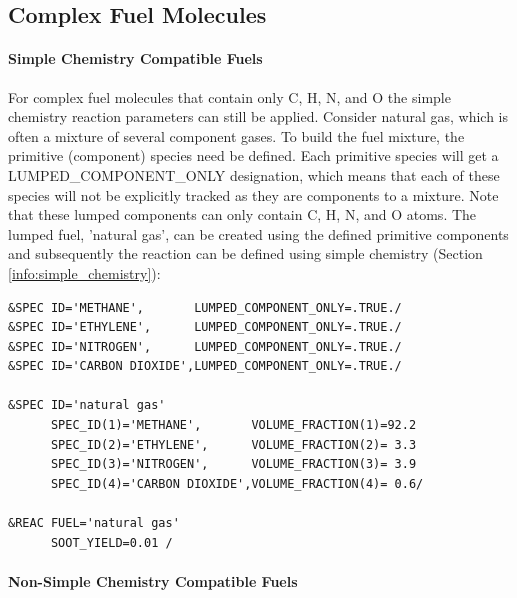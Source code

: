 \documentclass[11pt]{book}
\begin{document}
\subsection{Complex Fuel Molecules}
\label{info:Complex_Fuel}

\paragraph{Simple Chemistry Compatible Fuels}

For complex fuel molecules that contain only C, H, N, and O the simple chemistry reaction parameters can still be applied. Consider natural gas, which is often a mixture of several component gases. To build the fuel mixture, the primitive (component) species need be defined. Each primitive species will get a {\ct LUMPED\_COMPONENT\_ONLY} designation, which means that each of these species will not be explicitly tracked as they are components to a mixture.  Note that these lumped components can only contain C, H, N, and O atoms. The lumped fuel, {\ct 'natural gas'}, can be created using the defined primitive components and subsequently the reaction can be defined using simple chemistry (Section \ref{info:simple_chemistry}):
\begin{lstlisting}
&SPEC ID='METHANE',       LUMPED_COMPONENT_ONLY=.TRUE./
&SPEC ID='ETHYLENE',      LUMPED_COMPONENT_ONLY=.TRUE./
&SPEC ID='NITROGEN',      LUMPED_COMPONENT_ONLY=.TRUE./
&SPEC ID='CARBON DIOXIDE',LUMPED_COMPONENT_ONLY=.TRUE./

&SPEC ID='natural gas'
      SPEC_ID(1)='METHANE',       VOLUME_FRACTION(1)=92.2
      SPEC_ID(2)='ETHYLENE',      VOLUME_FRACTION(2)= 3.3
      SPEC_ID(3)='NITROGEN',      VOLUME_FRACTION(3)= 3.9
      SPEC_ID(4)='CARBON DIOXIDE',VOLUME_FRACTION(4)= 0.6/

&REAC FUEL='natural gas'
      SOOT_YIELD=0.01 /
\end{lstlisting}

\paragraph{Non-Simple Chemistry Compatible Fuels}
\end{document}
